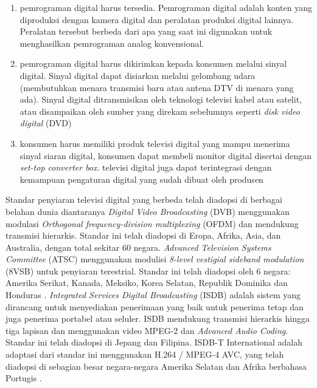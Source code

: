 \begin{enumerate}
	\item pemrograman digital harus tersedia. Pemrograman digital adalah konten yang diproduksi dengan kamera digital dan peralatan produksi digital lainnya. Peralatan tersebut berbeda dari apa yang saat ini digunakan untuk menghasilkan pemrograman analog konvensional.
	\item pemrograman digital harus dikirimkan kepada konsumen melalui sinyal digital. Sinyal digital dapat disiarkan melalui gelombang udara (membutuhkan menara transmisi baru atau antena DTV di menara yang ada). Sinyal digital ditransmisikan oleh teknologi televisi kabel atau satelit, atau disampaikan oleh sumber yang direkam sebelumnya seperti \textit{disk video digital} (DVD)
	\item konsumen harus memiliki produk televisi digital yang mampu menerima sinyal siaran digital, konsumen dapat membeli monitor digital disertai dengan \textit{set-top converter box}. televisi digital juga dapat terintegrasi dengan kemampuan pengaturan digital yang sudah dibuat oleh produsen \citep{Kruger2002}
\end{enumerate}

Standar penyiaran televisi digital yang berbeda telah diadopsi di berbagai belahan dunia diantaranya \textit{Digital Video Broadcasting} (DVB) menggunakan modulasi \textit{Orthogonal frequency-division multiplexing} (OFDM) dan mendukung transmisi hierarkis. Standar ini telah diadopsi di Eropa, Afrika, Asia, dan Australia, dengan total sekitar 60 negara. \textit{Advanced Television Systems Committee} (ATSC) menggunakan modulisi \textit{8-level vestigial sideband modulation} (8VSB) untuk penyiaran terestrial. Standar ini telah diadopsi oleh 6 negara: Amerika Serikat, Kanada, Meksiko, Korea Selatan, Republik Dominika dan Honduras \citep{dtvstatus2017}.  \textit{Integrated Services Digital Broadcasting} (ISDB) adalah sistem yang dirancang untuk menyediakan penerimaan yang baik untuk penerima tetap dan juga penerima portabel atau seluler. ISDB mendukung transmisi hierarkis hingga tiga lapisan dan menggunakan video MPEG-2 dan \textit{Advanced Audio Coding}. Standar ini telah diadopsi di Jepang dan Filipina. ISDB-T International adalah adaptasi dari standar ini menggunakan H.264 / MPEG-4 AVC, yang telah diadopsi di sebagian besar negara-negara Amerika Selatan dan Afrika berbahasa Portugis \citep{Ong2010}.


